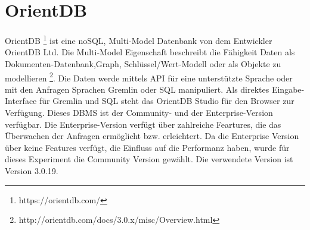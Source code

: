 \section{OrientDB}
OrientDB \footnote{https://orientdb.com/} ist eine noSQL,  Multi-Model Datenbank von dem Entwickler OrientDB Ltd. Die Multi-Model Eigenschaft beschreibt die Fähigkeit Daten als Dokumenten-Datenbank,Graph, Schlüssel/Wert-Modell oder als Objekte zu modellieren \footnote{http://orientdb.com/docs/3.0.x/misc/Overview.html}. Die Daten werde mittels API für eine unterstützte Sprache oder mit den Anfragen Sprachen Gremlin oder SQL manipuliert. Als direktes Eingabe-Interface für Gremlin und SQL steht das OrientDB Studio für den Browser zur Verfügung. Dieses DBMS ist der Community- und der Enterprise-Version verfügbar. Die Enterprise-Version verfügt über zahlreiche Feartures, die das Überwachen der Anfragen ermöglicht bzw. erleichtert. Da die Enterprise Version über keine Features verfügt, die Einfluss auf die  Performanz haben, wurde für dieses Experiment die Community Version gewählt. Die verwendete Version ist Version 3.0.19. 


